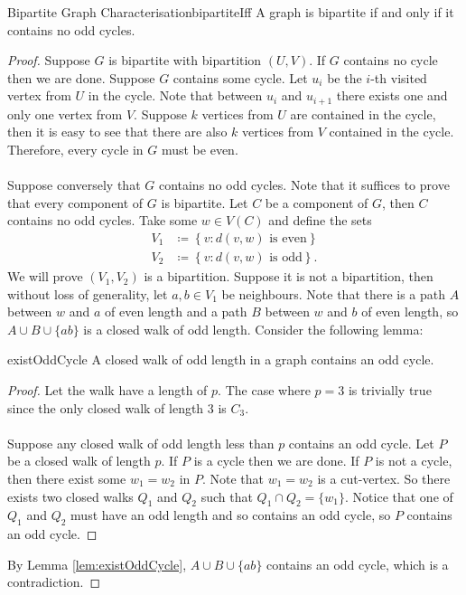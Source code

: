 \documentclass[math]{amznotes}
\theoremstyle{remark}
\newcommand{\0}{\mathbf{0}}
\newcommand{\1}{\mathbf{1}}
\begin{document}
\begin{thmbox}{Bipartite Graph Characterisation}{bipartiteIff}
    A graph is bipartite if and only if it contains no odd cycles.
    \tcblower
    \begin{proof}
        Suppose $G$ is bipartite with bipartition $(U, V)$. If $G$ contains no cycle then we are done. Suppose $G$ contains some cycle. Let $u_i$ be the $i$-th visited vertex from $U$ in the cycle. Note that between $u_i$ and $u_{i + 1}$ there exists one and only one vertex from $V$. Suppose $k$ vertices from $U$ are contained in the cycle, then it is easy to see that there are also $k$ vertices from $V$ contained in the cycle. Therefore, every cycle in $G$ must be even.
        \\\\
        Suppose conversely that $G$ contains no odd cycles. Note that it suffices to prove that every component of $G$ is bipartite. Let $C$ be a component of $G$, then $C$ contains no odd cycles. Take some $w \in V(C)$ and define the sets
        \begin{align*}
            V_1 & \coloneqq \left\{v \colon d(v, w) \textrm{ is even}\right\} \\
            V_2 & \coloneqq \left\{v \colon d(v, w) \textrm{ is odd}\right\}.
        \end{align*}
        We will prove $(V_1, V_2)$ is a bipartition. Suppose it is not a bipartition, then without loss of generality, let $a, b \in V_1$ be neighbours. Note that there is a path $A$ between $w$ and $a$ of even length and a path $B$ between $w$ and $b$ of even length, so $A \cup B \cup \{ab\}$ is a closed walk of odd length. Consider the following lemma:
        \begin{lembox}{}{existOddCycle}
            A closed walk of odd length in a graph contains an odd cycle.
            \tcblower
            \begin{proof}
                Let the walk have a length of $p$. The case where $p = 3$ is trivially true since the only closed walk of length $3$ is $C_3$. 
                \\\\
                Suppose any closed walk of odd length less than $p$ contains an odd cycle. Let $P$ be a closed walk of length $p$. If $P$ is a cycle then we are done. If $P$ is not a cycle, then there exist some $w_1 = w_2$ in $P$. Note that $w_1 = w_2$ is a cut-vertex. So there exists two closed walks $Q_1$ and $Q_2$ such that $Q_1 \cap Q_2 = \{w_1\}$. Notice that one of $Q_1$ and $Q_2$ must have an odd length and so contains an odd cycle, so $P$ contains an odd cycle.
            \end{proof}
        \end{lembox}
        By Lemma \ref{lem:existOddCycle}, $A \cup B \cup \{ab\}$ contains an odd cycle, which is a contradiction. 
    \end{proof}
\end{thmbox}
\end{document}
